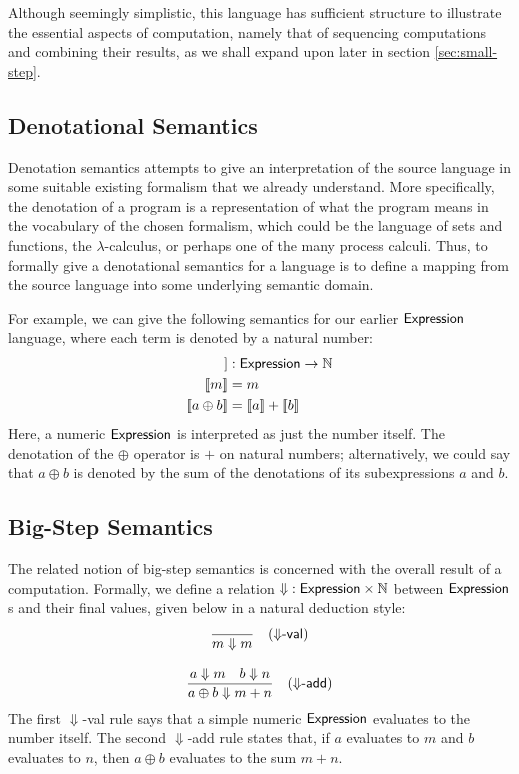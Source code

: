 Although seemingly simplistic, this language has sufficient structure to
illustrate the essential aspects of computation, namely that of sequencing
computations and combining their results, as we shall expand upon later in
section \ref{sec:small-step}.


\subsection{Denotational Semantics}%

\def\sb[#1]{[\![#1]\!]}

Denotation semantics attempts to give an interpretation of the source
language in some suitable existing formalism that we already understand.
More specifically, the denotation of a program is a representation of what
the program means in the vocabulary of the chosen formalism, which could be
the language of sets and functions, the $\lambda$-calculus, or perhaps one
of the many process calculi. Thus, to formally give a denotational semantics
for a language is to define a mapping from the source language into some
underlying semantic domain.

For example, we can give the following semantics for our earlier
$\mathsf{Expression}$ language, where each term is denoted by a natural number:
\begin{align*}
	\sb[\anonymous] &: \Expression \rightarrow \Nat \\
	\sb[ m ] &= m \\
	\sb[ a \oplus b ] &= \sb[ a ] + \sb[ b ]
\end{align*}
Here, a numeric $\mathsf{Expression}$ is interpreted as just the number itself. The
denotation of the $\oplus$ operator is $+$ on natural numbers;
alternatively, we could say that $a \oplus b$ is denoted by the sum of the
denotations of its subexpressions $a$ and $b$.


\subsection{Big-Step Semantics}%

\def\ruleName#1{\textsf{#1}}
\def\ruleTag#1{\quad(\ruleName{#1})}

The related notion of big-step semantics is concerned with the overall
result of a computation. Formally, we define a relation ${\Downarrow}
: \mathsf{Expression} \times \mathbb{N}$ between $\mathsf{Expression}$s and their final values,
given below in a natural deduction style:
\begin{gather*}
\frac{\rule{0pt}{1pt}}%
	{m \Downarrow m} \ruleTag{$\Downarrow$-val} \\[2ex]
\frac{a \Downarrow m \quad b \Downarrow n}%
	{a \oplus b \Downarrow m + n} \ruleTag{$\Downarrow$-add}
\end{gather*}
The first \ruleName{$\Downarrow$-val} rule says that a simple numeric
$\mathsf{Expression}$ evaluates to the number itself. The second
\ruleName{$\Downarrow$-add} rule states that, if $a$ evaluates to $m$ and
$b$ evaluates to $n$, then $a \oplus b$ evaluates to the sum $m + n$.

